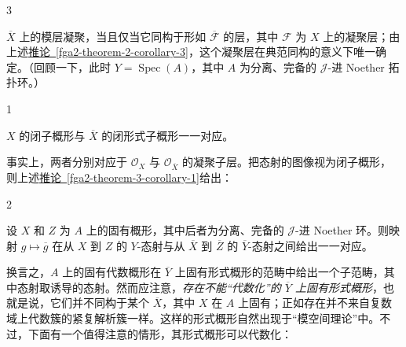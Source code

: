 \begin{theorem}{3}\label{fga2-theorem-3}\skipsinglepar
\par{}\(\overline {X}\) 上的模层凝聚，当且仅当它同构于形如 \(\overline {\mathscr {F}}\) 的层，其中 \(\mathscr {F}\) 为 \(X\) 上的凝聚层；由上述\hyperref[fga2-theorem-2-corollary-3]{推论~\ref*{fga2-theorem-2-corollary-3}}，这个凝聚层在典范同构的意义下唯一确定。（回顾一下，此时 \(Y=\operatorname {Spec}(A)\)，其中 \(A\) 为分离、完备的 \(\mathscr {J}\)-进 Noether 拓扑环。）\end{theorem}
\begin{corollary}{1}\label{fga2-theorem-3-corollary-1}\skipsinglepar
\par{}\(X\) 的闭子概形与 \(\overline {X}\) 的闭形式子概形一一对应。\end{corollary}
\par{}事实上，两者分别对应于 \(\mathcal {O}_X\) 与 \(\mathcal {O}_{\overline {X}}\) 的凝聚子层。把态射的图像视为闭子概形，则上述\hyperref[fga2-theorem-3-corollary-1]{推论~\ref*{fga2-theorem-3-corollary-1}}给出：
\begin{corollary}{2}\label{fga2-theorem-3-corollary-2}\skipsinglepar
\par{}设 \(X\) 和 \(Z\) 为 \(A\) 上的固有概形，其中后者为分离、完备的 \(\mathscr {J}\)-进 Noether 环。则映射 \(g\mapsto \overline {g}\) 在从 \(X\) 到 \(Z\) 的 \(Y\)-态射与从 \(\overline {X}\) 到 \(\overline {Z}\) 的 \(\overline {Y}\)-态射之间给出一一对应。\end{corollary}
\par{}换言之，\(A\) 上的固有代数概形在 \(\overline {Y}\) 上固有形式概形的范畴中给出一个子范畴，其中态射取诱导的态射。然而应注意，\emph{存在不能“代数化”的 \(\overline {Y}\) 上固有形式概形}，也就是说，它们并不同构于某个 \(\overline {X}\)，其中 \(X\) 在 \(A\) 上固有；正如存在并不来自复数域上代数簇的紧复解析簇一样。这样的形式概形自然出现于“模空间理论”中。不过，下面有一个值得注意的情形，其形式概形可以代数化：
